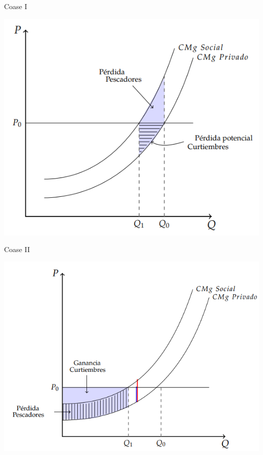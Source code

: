 \documentclass{beamer}
\begin{document}
\begin{frame}{Coase I}
    \begin{center}
        \includegraphics[scale=0.7]{../Figures/C25.6.png}
    \end{center}
\end{frame}
 
\begin{frame}{Coase II}
    \begin{center}
        \includegraphics[scale=0.7]{../Figures/C25.7.png}
    \end{center}
\end{frame}
\end{document}
